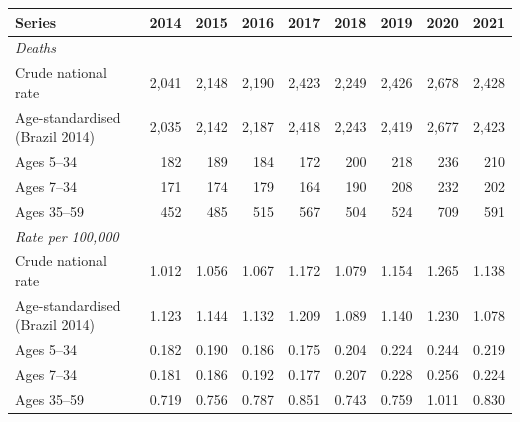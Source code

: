 \begin{tabular}{lrrrrrrrr}
\toprule
Series & 2014 & 2015 & 2016 & 2017 & 2018 & 2019 & 2020 & 2021 \\
\midrule
\multicolumn{9}{l}{\emph{Deaths}} \\
Crude national rate & 2,041 & 2,148 & 2,190 & 2,423 & 2,249 & 2,426 & 2,678 & 2,428 \\
Age-standardised (Brazil 2014) & 2,035 & 2,142 & 2,187 & 2,418 & 2,243 & 2,419 & 2,677 & 2,423 \\
Ages 5--34 & 182 & 189 & 184 & 172 & 200 & 218 & 236 & 210 \\
Ages 7--34 & 171 & 174 & 179 & 164 & 190 & 208 & 232 & 202 \\
Ages 35--59 & 452 & 485 & 515 & 567 & 504 & 524 & 709 & 591 \\
\midrule
\multicolumn{9}{l}{\emph{Rate per 100,000}} \\
Crude national rate & 1.012 & 1.056 & 1.067 & 1.172 & 1.079 & 1.154 & 1.265 & 1.138 \\
Age-standardised (Brazil 2014) & 1.123 & 1.144 & 1.132 & 1.209 & 1.089 & 1.140 & 1.230 & 1.078 \\
Ages 5--34 & 0.182 & 0.190 & 0.186 & 0.175 & 0.204 & 0.224 & 0.244 & 0.219 \\
Ages 7--34 & 0.181 & 0.186 & 0.192 & 0.177 & 0.207 & 0.228 & 0.256 & 0.224 \\
Ages 35--59 & 0.719 & 0.756 & 0.787 & 0.851 & 0.743 & 0.759 & 1.011 & 0.830 \\
\bottomrule
\end{tabular}
